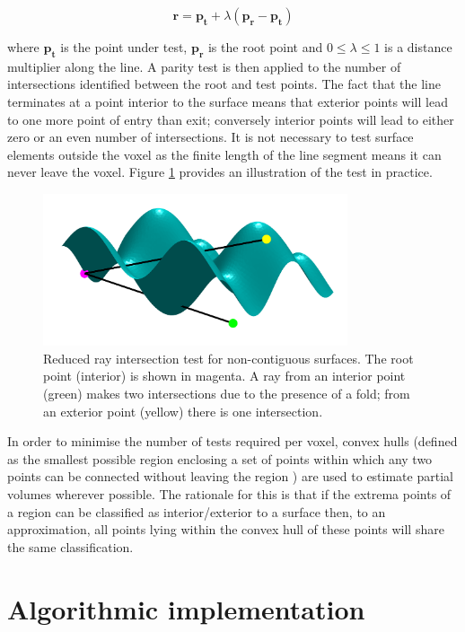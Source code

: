 \documentclass[12pt]{report}
\renewcommand{\vec}[1]{\mathbf{#1}}
\begin{document}
\begin{equation}
\vec{r} = \vec{p_t} + \lambda(\vec{p_r} - \vec{p_t})
\end{equation} 

where $\vec{p_t}$ is the point under test, $\vec{p_r}$ is the root point and $0 \leq \lambda \leq 1$ is a distance multiplier along the line. A parity test is then applied to the number of intersections identified between the root and test points. The fact that the line terminates at a point interior to the surface means that exterior points will lead to one more point of entry than exit; conversely interior points will lead to either zero or an even number of intersections. It is not necessary to test surface elements outside the voxel as the finite length of the line segment means it can never leave the voxel. Figure \ref{raytest} provides an illustration of the test in practice. 

\begin{figure}
\centering
\includegraphics[width = 0.8\textwidth]{raytest.png}
\caption{Reduced ray intersection test for non-contiguous surfaces. The root point (interior) is shown in magenta. A ray from an interior point (green) makes two intersections due to the presence of a fold; from an exterior point (yellow) there is one intersection.}
\label{raytest}
\end{figure}

In order to minimise the number of tests required per voxel, convex hulls (defined as the smallest possible region enclosing a set of points within which any two points can be connected without leaving the region \cite{DeBerg2008}) are used to estimate partial volumes wherever possible. The rationale for this is that if the extrema points of a region can be classified as interior/exterior to a surface then, to an approximation, all points lying within the convex hull of these points will share the same classification. 

\section{Algorithmic implementation}
\end{document}
